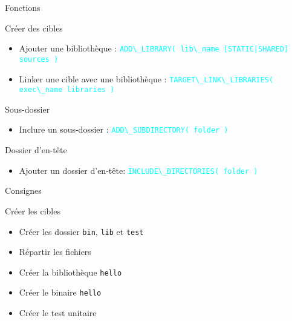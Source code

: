 \documentclass{beamer}
\begin{document}
\begin{frame}[fragile]{Fonctions}
  \begin{block}{Créer des cibles}
    \begin{itemize}
    \item Ajouter une bibliothèque :\linebreak
      \textcolor{cyan}{\verb?ADD\_LIBRARY( lib\_name [STATIC|SHARED] sources )?}
    \item Linker une cible avec une bibliothèque :\linebreak
      \textcolor{cyan}{\verb?TARGET\_LINK\_LIBRARIES( exec\_name libraries )?}%
    \end{itemize}
  \end{block}

  \begin{block}{Sous-dossier}
    \begin{itemize}
    \item Inclure un sous-dossier :\linebreak
      \textcolor{cyan}{\verb?ADD\_SUBDIRECTORY( folder )?}
    \end{itemize}
  \end{block}  

  \begin{block}{Dossier d'en-tête}
    \begin{itemize}
    \item Ajouter un dossier d'en-tête:\linebreak
      \textcolor{cyan}{\verb?INCLUDE\_DIRECTORIES( folder )?}
    \end{itemize}
  \end{block}
  
\end{frame}

\begin{frame}[fragile]{Consignes}
  \begin{exampleblock}{Créer les cibles}
    \begin{itemize}
    \item Créer les dossier \verb?bin?, \verb?lib? et \verb?test?
    \item Répartir les fichiers
    \item Créer la bibliothèque \verb?hello?
    \item Créer le binaire \verb?hello?
    \item Créer le test unitaire
    \end{itemize}
  \end{exampleblock}
\end{frame}
\end{document}
